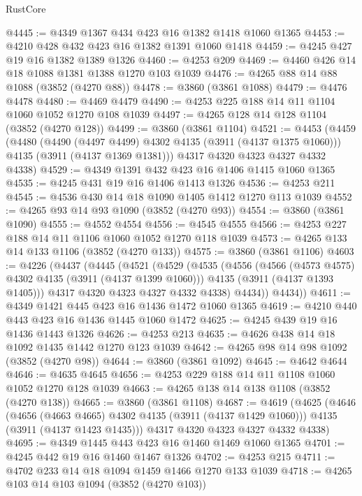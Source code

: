 \begin{lexlean}{RustCore}
\begin{coremodule}
@4445 := @4349 @1367 @434 @423 @16 @1382 @1418 @1060 @1365
@4453 := @4210 @428 @432 @423 @16 @1382 @1391 @1060 @1418
@4459 := @4245 @427 @19 @16 @1382 @1389 @1326
@4460 := @4253 @209
@4469 := @4460 @426 @14 @18 @1088 @1381 @1388 @1270 @103 @1039
@4476 := @4265 @88 @14 @88 @1088 (@3852 (@4270 @88))
@4478 := @3860 (@3861 @1088)
@4479 := @4476 @4478
@4480 := @4469 @4479
@4490 := @4253 @225 @188 @14 @11 @1104 @1060 @1052 @1270 @108 @1039
@4497 := @4265 @128 @14 @128 @1104 (@3852 (@4270 @128))
@4499 := @3860 (@3861 @1104)
@4521 := @4453
    (@4459
      (@4480
        (@4490 (@4497 @4499) @4302 @4135 (@3911 (@4137 @1375 @1060)))
        @4135
        (@3911 (@4137 @1369 @1381)))
      @4317
      @4320
      @4323
      @4327
      @4332
      @4338)
@4529 := @4349 @1391 @432 @423 @16 @1406 @1415 @1060 @1365
@4535 := @4245 @431 @19 @16 @1406 @1413 @1326
@4536 := @4253 @211
@4545 := @4536 @430 @14 @18 @1090 @1405 @1412 @1270 @113 @1039
@4552 := @4265 @93 @14 @93 @1090 (@3852 (@4270 @93))
@4554 := @3860 (@3861 @1090)
@4555 := @4552 @4554
@4556 := @4545 @4555
@4566 := @4253 @227 @188 @14 @11 @1106 @1060 @1052 @1270 @118 @1039
@4573 := @4265 @133 @14 @133 @1106 (@3852 (@4270 @133))
@4575 := @3860 (@3861 @1106)
@4603 := @4226
    (@4437
      (@4445
        (@4521
          (@4529
            (@4535
              (@4556
                (@4566 (@4573 @4575) @4302 @4135 (@3911 (@4137 @1399 @1060)))
                @4135
                (@3911 (@4137 @1393 @1405)))
              @4317
              @4320
              @4323
              @4327
              @4332
              @4338)
            @4434))
        @4434))
@4611 := @4349 @1421 @445 @423 @16 @1436 @1472 @1060 @1365
@4619 := @4210 @440 @443 @423 @16 @1436 @1445 @1060 @1472
@4625 := @4245 @439 @19 @16 @1436 @1443 @1326
@4626 := @4253 @213
@4635 := @4626 @438 @14 @18 @1092 @1435 @1442 @1270 @123 @1039
@4642 := @4265 @98 @14 @98 @1092 (@3852 (@4270 @98))
@4644 := @3860 (@3861 @1092)
@4645 := @4642 @4644
@4646 := @4635 @4645
@4656 := @4253 @229 @188 @14 @11 @1108 @1060 @1052 @1270 @128 @1039
@4663 := @4265 @138 @14 @138 @1108 (@3852 (@4270 @138))
@4665 := @3860 (@3861 @1108)
@4687 := @4619
    (@4625
      (@4646
        (@4656 (@4663 @4665) @4302 @4135 (@3911 (@4137 @1429 @1060)))
        @4135
        (@3911 (@4137 @1423 @1435)))
      @4317
      @4320
      @4323
      @4327
      @4332
      @4338)
@4695 := @4349 @1445 @443 @423 @16 @1460 @1469 @1060 @1365
@4701 := @4245 @442 @19 @16 @1460 @1467 @1326
@4702 := @4253 @215
@4711 := @4702 @233 @14 @18 @1094 @1459 @1466 @1270 @133 @1039
@4718 := @4265 @103 @14 @103 @1094 (@3852 (@4270 @103))

\end{coremodule}
\end{lexlean}

